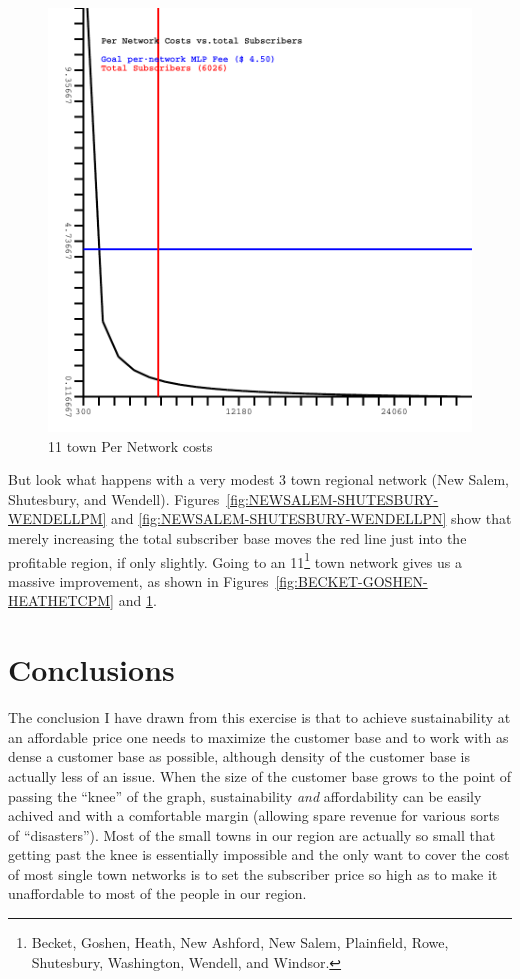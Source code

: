 \documentclass[12pt]{article}
\begin{document}
\begin{figure}[Hpbt]
\begin{centering}
\includegraphics[width=5in]{BECKET-GOSHEN-HEATH-NEW_ASHFORD-NEW_SALEM-PLAINFIELD-ROWE-SHUTESBURY-WASHINGTON-WENDELL-WINDSOR-PerNetwork.pdf}
\caption{11 town Per Network costs}
\label{fig:BECKET-GOSHEN-HEATHETCPN}
\end{centering}
\end{figure}

\clearpage

But look what happens with a very modest 3 town regional network (New Salem,
Shutesbury, and Wendell). Figures~\ref{fig:NEWSALEM-SHUTESBURY-WENDELLPM} and
\ref{fig:NEWSALEM-SHUTESBURY-WENDELLPN} show that merely increasing the total
subscriber base moves the red line just into the profitable region, if only
slightly. Going to an 11\footnote{Becket, Goshen, Heath, New Ashford, New
Salem, Plainfield, Rowe, Shutesbury, Washington, Wendell, and Windsor.} town
network gives us a massive improvement, as shown in
Figures~\ref{fig:BECKET-GOSHEN-HEATHETCPM} and
\ref{fig:BECKET-GOSHEN-HEATHETCPN}.

\section{Conclusions}

The conclusion I have drawn from this exercise is that to achieve sustainability
at an affordable price one needs to maximize the customer base and to work
with as dense a customer base as possible, although density of the customer
base is actually less of an issue. When the size of the customer base grows to
the point of passing the ``knee'' of the graph, sustainability \textit{and}
affordability can be easily achived and with a comfortable margin (allowing
spare revenue for various sorts of ``disasters''). Most of the small towns in
our region are actually so small that getting past the knee is essentially
impossible and the only want to cover the cost of most single town networks is
to set the subscriber price so high as to make it unaffordable to most of the
people in our region.
\end{document}
